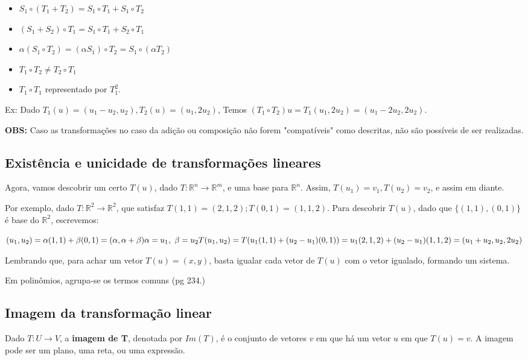 \documentclass[letterpaper, 11pt]{article}
\begin{document}
\begin{itemize}
\item \(S_1 \circ (T_1 + T_2) = S_1 \circ T_1 + S_1 \circ T_2\)
\item \((S_1 + S_2) \circ T_1 = S_1 \circ T_1 + S_2 \circ T_1\)
\item \(\alpha (S_1 \circ T_2) = (\alpha S_1) \circ T_2 = S_1 \circ (\alpha T_2)\)
\item \(T_1 \circ T_2 \ne T_2 \circ T_1\)
\item \(T_1 \circ T_1\) representado por \(T^2_1\).
\end{itemize}

Ex: Dado \(T_1(u) = (u_1 - u_2, u_2), T_2(u) = (u_1,2u_2)\), Temos \((T_1 \circ T_2)u = T_1(u_1,2u_2) = (u_1 - 2u_2, 2u_2)\).

\textbf{OBS:} Caso as transformações no caso da adição ou composição não forem "compatíveis" como descritas, não são possíveis de ser realizadas.

\subsection{Existência e unicidade de transformações lineares}
\label{sec:org80db819}
Agora, vamos descobrir um certo \(T(u)\), dado \(T: \mathbb{R}^n \to \mathbb{R}^m\), e uma base para \(\mathbb{R}^n\). Assim, \(T(u_1) = v_1, T(u_2) = v_2\), e assim em diante.

Por exemplo, dado \(T: \mathbb{R}^2 \to \mathbb{R}^2\), que satisfaz \(T(1,1) = (2,1,2); T(0,1) = (1,1,2)\). Para descobrir \(T(u)\), dado que \(\{(1,1),(0,1)\}\) é base do \(\mathbb{R}^2\), escrevemos:

\begin{center} $(u_1,u_2) = \alpha(1,1) + \beta(0,1) = (\alpha, \alpha + \beta) \\ \alpha = u_1, \ \beta = u_2 \\ T(u_1,u_2) = T(u_1(1,1) + (u_2-u_1)(0,1)) \\ = u_1(2,1,2) + (u_2-u_1)(1,1,2) \\ = (u_1 + u_2, u_2, 2u_2)$ \end{center}

Lembrando que, para achar um vetor \(T(u) = (x,y)\), basta igualar cada vetor de \(T(u)\) com o vetor igualado, formando um sistema.

Em polinômios, agrupa-se os termos comuns (pg 234.)

\subsection{Imagem da transformação linear}
\label{sec:org287b87b}
Dado \(T: U \to V\), a \textbf{imagem de T}, denotada por \(Im(T)\), é o conjunto de vetores \(v\) em que há um vetor \(u\) em que \(T(u) = v\). A imagem pode ser um plano, uma reta, ou uma expressão.
\end{document}
